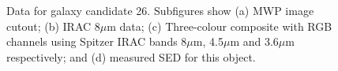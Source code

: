 \documentclass[times,usenatbib]{mn2e}
\begin{document}
\begin{figure}
\begin{center}
\caption{Data for galaxy candidate 26. Subfigures show (a) MWP image cutout; (b) IRAC 8$\mu$m data; (c) Three-colour composite with RGB channels using Spitzer IRAC bands 8$\mu$m, 4.5$\mu$m and 3.6$\mu$m respectively; and (d) measured SED for this object.}
\label{gal26}
\end{center}
\end{figure} 
\end{document}

